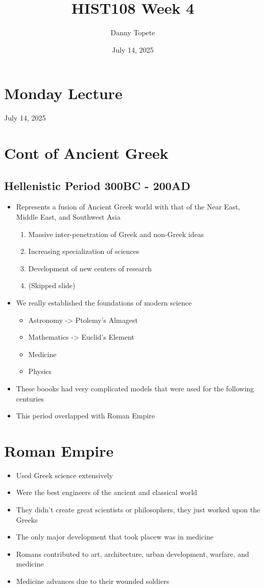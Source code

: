\documentclass{article}
\title{HIST108 Week 4}
\author{Danny Topete}
\date{July 14, 2025}
\begin{document}
\maketitle

\section*{Monday Lecture}
July 14, 2025

\section{Cont of Ancient Greek}

\subsection{Hellenistic Period 300BC - 200AD}
\begin{itemize}
  \item Represents a fusion of Ancient Greek world
    with that of the Near East, Middle East, and Southwest Asia
    \begin{enumerate}
      \item Massive inter-penetration of Greek and non-Greek ideas
      \item Increasing specialization of sciences
      \item Development of new centers of research
      \item (Skipped slide)
    \end{enumerate}
  \item We really established the foundations of modern science
    \begin{itemize}
      \item Astronomy -> Ptolemy's Almagest
      \item Mathematics -> Euclid's Element
      \item Medicine
      \item Physics
    \end{itemize}
  \item These boooks had very complicated models that were used for the following centuries
  \item This period overlapped with Roman Empire
\end{itemize}

\section{Roman Empire}
\begin{itemize}
  \item Used Greek science extensively
  \item Were the best engineers of the ancient and classical world
  \item They didn't create great scientists or philosophers, they
    just worked upon the Greeks
  \item The only major development that took placew was in medicine
  \item Romans contributed to art, architecture, urban development, warfare, and medicine
  \item Medicine advances due to their wounded soldiers
\end{itemize}
\end{document}
